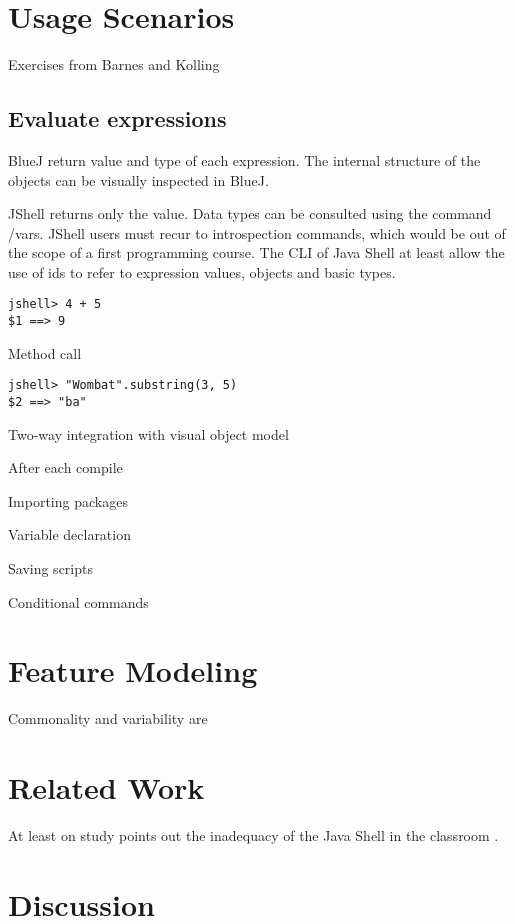 \documentclass{article}
\begin{document}
\section{Usage Scenarios}

Exercises from Barnes and Kolling

\subsection{Evaluate expressions}

BlueJ return value and type of each expression. 
The internal structure of the objects can be visually inspected in BlueJ. 

JShell returns only the value. Data types can be consulted using the command /vars.
JShell users must recur to introspection commands, which would be out of the scope of a first programming course. 
The CLI of Java Shell at least allow the use of ids to refer to expression values,  objects  and basic types.

\begin{lstlisting}
jshell> 4 + 5
$1 ==> 9
\end{lstlisting}

Method call
\begin{lstlisting}
jshell> "Wombat".substring(3, 5)
$2 ==> "ba"
\end{lstlisting}
Two-way integration with visual object model

After each compile

Importing packages

Variable declaration

Saving scripts

Conditional commands


\section{Feature Modeling}
Commonality and variability are

\section{Related Work}

At least on study points out the inadequacy of the Java Shell in the classroom
\cite{politz_minnes2018jshell}.

\section{Discussion}
\end{document}
